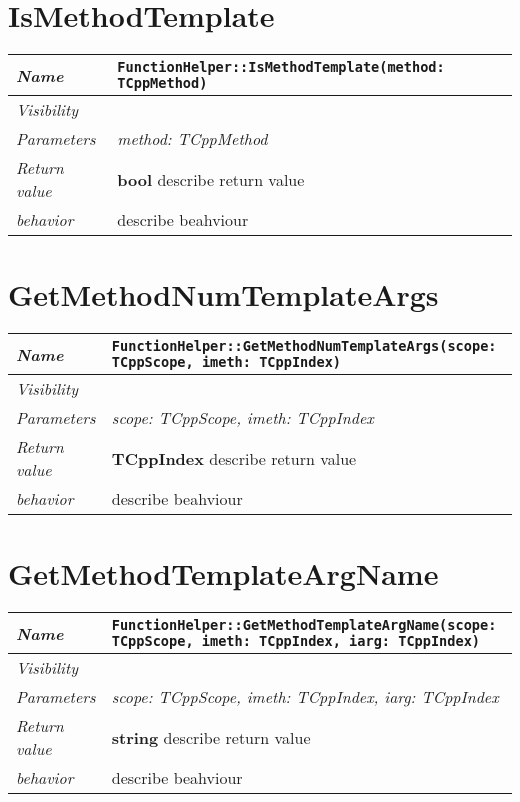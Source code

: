  \section{IsMethodTemplate}
\begin{longtable}{p{3cm} @{\hskip 1cm} p{12cm}}
 \hline
\textit{Name} & \texttt{FunctionHelper::IsMethodTemplate(method: TCppMethod)}\\
\hline
 \textit{Visibility} & \\
\hline
\textit{Parameters} & \textit{method: TCppMethod}\\
\hline
\textit{Return value} & \textbf{ bool} describe return value\\
  \hline
 \textit{behavior} & describe beahviour \\
\hline
\end{longtable} \pagebreak
 \section{GetMethodNumTemplateArgs}
\begin{longtable}{p{3cm} @{\hskip 1cm} p{12cm}}
 \hline
\textit{Name} & \texttt{FunctionHelper::GetMethodNumTemplateArgs(scope: TCppScope, imeth: TCppIndex)}\\
\hline
 \textit{Visibility} & \\
\hline
\textit{Parameters} & \textit{scope: TCppScope, imeth: TCppIndex}\\
\hline
\textit{Return value} & \textbf{ TCppIndex} describe return value\\
  \hline
 \textit{behavior} & describe beahviour \\
\hline
\end{longtable} \pagebreak
 \section{GetMethodTemplateArgName}
\begin{longtable}{p{3cm} @{\hskip 1cm} p{12cm}}
 \hline
\textit{Name} & \texttt{FunctionHelper::GetMethodTemplateArgName(scope: TCppScope, imeth: TCppIndex, iarg: TCppIndex)}\\
\hline
 \textit{Visibility} & \\
\hline
\textit{Parameters} & \textit{scope: TCppScope, imeth: TCppIndex, iarg: TCppIndex}\\
\hline
\textit{Return value} & \textbf{ string} describe return value\\
  \hline
 \textit{behavior} & describe beahviour \\
\hline
\end{longtable} \pagebreak
